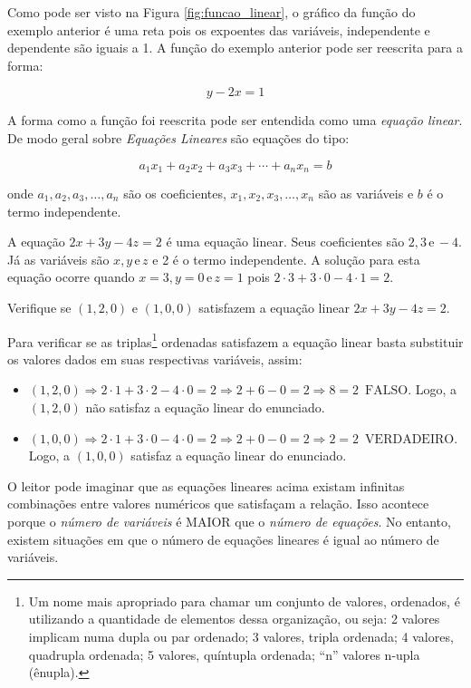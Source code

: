 Como pode ser visto na Figura \ref{fig:funcao_linear}, o gráfico da função do exemplo anterior é uma reta pois os expoentes das variáveis,
independente e dependente são iguais a 1. A função do exemplo anterior pode ser reescrita para a forma:

$$
y-2x=1
$$

A forma como a função foi reescrita pode ser entendida como uma \textit{equação linear}. De modo geral sobre \textit{Equações Lineares} são equações do tipo:

$$
a_{1}x_{1}+a_{2}x_{2}+a_{3}x_{3}+\cdots+a_{n}x_{n}=b
$$

onde $a_1, a_2, a_3, \ldots, a_n$ são os coeficientes, $x_1, x_2, x_3, \ldots, x_n$ são as variáveis e $b$ é o termo independente.
\begin{example}
	A equação $2x + 3y -4z = 2$ é uma equação linear. Seus coeficientes são $2,3\, \mathrm{e}\,-4$. Já as variáveis são $x,y\, \mathrm{e}\, z$
	e 2 é o termo independente. A solução para esta equação ocorre quando $x=3, y=0\, \mathrm{e}\,z=1$ pois $2\cdot 3+3\cdot 0 -4 \cdot 1 = 2$.
\end{example}
%
\begin{example}
	Verifique se $(1,2,0)$ e $(1,0,0)$ satisfazem a equação linear $2x+3y-4z=2$.

	Para verificar se as triplas\footnote{Um nome mais apropriado para chamar um conjunto de valores, ordenados, é utilizando a quantidade de elementos dessa organização, ou seja: 2 valores implicam numa dupla ou par ordenado; 3 valores, tripla ordenada; 4 valores, quadrupla ordenada; 5 valores, quíntupla ordenada; ``n'' valores n-upla (ênupla).} ordenadas satisfazem a equação linear basta substituir os valores
	dados em suas respectivas variáveis, assim:

\begin{itemize}
	\item $(1,2,0)\Rightarrow 2\cdot 1 +3 \cdot 2 -4 \cdot 0 = 2 \Rightarrow 2+6-0=2 \Rightarrow 8=2\,\,\,\mathrm{FALSO}$.
	Logo, a $(1,2,0)$ não satisfaz a equação linear do enunciado.
	\item $(1,0,0)\Rightarrow 2\cdot 1 +3 \cdot 0 -4 \cdot 0 = 2 \Rightarrow 2+0-0=2 \Rightarrow 2=2\,\,\,\mathrm{VERDADEIRO}$.
	Logo, a $(1,0,0)$ satisfaz a equação linear do enunciado.
\end{itemize}
\end{example}
%
O leitor pode imaginar que as equações lineares acima existam infinitas combinações entre valores numéricos que satisfaçam a relação. Isso
acontece porque o \textit{número de variáveis} é MAIOR que o \textit{número de equações}. No entanto, existem situações em que o número de equações lineares é igual ao número de variáveis.

